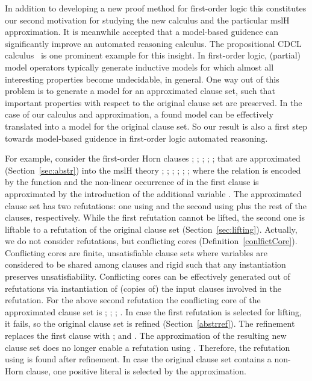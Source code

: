 \documentclass{llncs}
\begin{document}
In addition to developing a new proof method for first-order logic this constitutes our second motivation
for studying the new calculus and the particular mslH approximation. It is meanwhile accepted that
a model-based guidence can significantly improve an automated reasoning calculus. The propositional
CDCL calculus~\cite{NieuwenhuisEtAl06} 
is one prominent example for this insight. In first-order logic, (partial) model operators
typically generate inductive models for which almost all interesting properties become undecidable,
in general. One way out of this problem is to generate a model for an approximated clause set, such
that important properties with respect to the original clause set are preserved. In the case of our calculus and approximation, a found model
can be effectively translated into a model for the original clause set. So our result is also a first
step towards model-based guidence in first-order logic automated reasoning.

For example, consider the first-order Horn clauses 
; ; ; ; ; 
that are approximated (Section~\ref{sec:abstr}) into the mslH theory
; ; ; ; ; ; 
where the relation  is encoded by the function  and the non-linear occurrence of  in the first
clause is approximated by the introduction of the additional variable . The approximated clause set
has two refutations: one using  and the second using  plus
the rest of the clauses, respectively. While the first refutation cannot be lifted, the second one is liftable to 
a refutation of the original clause set (Section~\ref{sec:lifting}). Actually, we do not consider refutations, but conflicting cores (Definition~\ref{conlfictCore}).
Conflicting cores are finite, unsatisfiable clause sets where variables are considered to be shared among clauses and rigid such that
any instantiation preserves unsatisfiability. Conflicting cores can be effectively generated out of refutations via instantiation
of (copies of) the input clauses involved in the refutation.
For the above second refutation the conflicting core of the approximated clause set is
; ; ; .\newline
In case the first refutation is selected for lifting, it fails, so the original clause set is refined (Section~\ref{abstrref}). The refinement
replaces the first clause with\newline
;  and .\newline
The approximation of the resulting new clause set does no longer enable a refutation using . Therefore, the refutation using  is found after refinement.
In case the original clause set contains a non-Horn clause, one positive literal is selected by the approximation.
\end{document}
